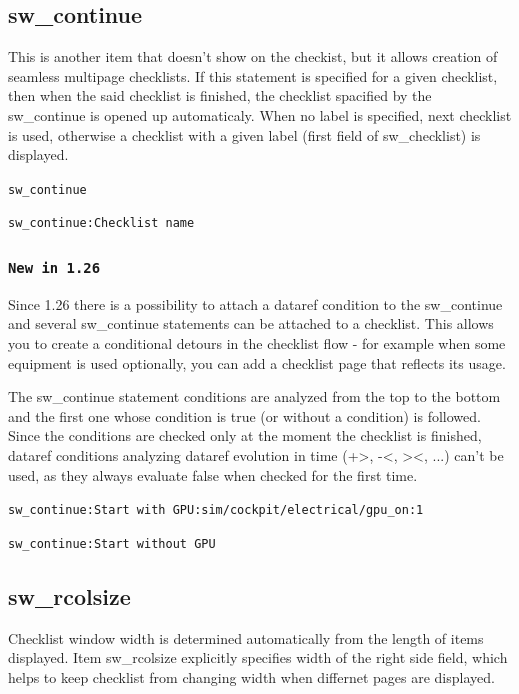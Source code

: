 \documentclass[11pt,parskip=half,a4paper]{scrartcl}
\newcommand\textstyleSourceText[1]{\texttt{#1}}
\begin{document}
\subsection[sw\_continue]{sw\_continue}
This is another item that doesn't show on the checkist, but it allows creation of {\textquotedbl}seamless{\textquotedbl}
multipage checklists. If this statement is specified for a given checklist, then when the said checklist is finished, the checklist spacified by the sw\_continue is opened up automaticaly. When no label is specified, next checklist is used, otherwise a checklist with a given label (first field of sw\_checklist) is displayed.

\textstyleSourceText{sw\_continue}

\textstyleSourceText{sw\_continue:Checklist name}

\subsubsection[New in 1.26]{\textstyleSourceText{New in 1.26}}
Since 1.26 there is a possibility to attach a dataref condition to the sw\_continue and several sw\_continue statements can be attached to a checklist. This allows you to create a conditional {\textquotedbl}detours{\textquotedbl} in the checklist flow - for example when some equipment is used optionally, you can add a checklist page that reflects its usage.

The sw\_continue statement conditions are analyzed from the top to the bottom and the first one whose condition is true (or without a condition) is followed. Since the conditions are checked only at the moment the checklist is finished, dataref conditions analyzing dataref evolution in time ({\textquotedbl}+{\textgreater}{\textquotedbl},
{\textquotedbl}-{\textless}{\textquotedbl}, {\textquotedbl}{\textgreater}{\textless}{\textquotedbl}, ...) can't be used, as they always evaluate false when checked for the first time.

{\ttfamily
\textstyleSourceText{sw\_continue:Start with GPU:sim/cockpit/electrical/gpu\_on:1}}

{\ttfamily
\textstyleSourceText{sw\_continue:Start without GPU}}

\subsection{sw\_rcolsize}
Checklist window width is determined automatically from the length of items displayed. Item sw\_rcolsize explicitly specifies width of the right side field, which helps to keep checklist from changing width when differnet pages are displayed.
\end{document}
